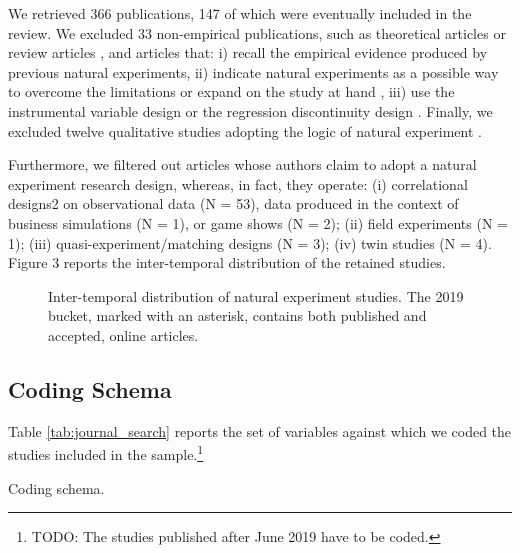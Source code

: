 \documentclass[nobib]{tufte-handout}
\newcommand{\todo}[1]{}
\renewcommand{\todo}[1]{{\color{red} TODO: {#1}}}
\begin{document}
\begin{refsection}
We retrieved 366 publications, 147 of which were eventually included in the
review.  We excluded 33 non-empirical publications, such as theoretical articles
\parencite[e.g.,][]{makadok2011} or review articles
\parencite[e.g.,][]{shaver2020}, and articles that: i) recall the empirical
evidence produced by previous natural experiments, ii) indicate natural
experiments as a possible way to overcome the limitations or expand on the study
at hand \parencite[e.g.,][]{hsu2006}, iii) use the instrumental variable design
\parencite[e.g.,][]{zoloty2018} or the regression discontinuity design
\parencite[e.g.,][]{flammer2015}. Finally, we excluded twelve qualitative studies
adopting the logic of natural experiment \parencite[e.g.,][]{powell2017}.

Furthermore, we filtered out articles whose authors claim to adopt a natural
experiment research design, whereas, in fact, they operate: (i) correlational
designs2 on observational data (N = 53), data produced in the context of
business simulations (N = 1), or game shows (N = 2); (ii) field experiments (N =
1); (iii) quasi-experiment/matching designs (N = 3); (iv) twin studies (N = 4).
Figure 3 reports the inter-temporal distribution of the retained studies.

\begin{figure}[]
    \centering
    
    \caption{Inter-temporal distribution of natural experiment studies.
    The 2019 bucket, marked with an asterisk, contains both published and 
    accepted, online articles.}
    \label{fig:studies_over_time}
\end{figure}

\subsection{Coding Schema}
\label{sub:coding_schema}

Table \ref{tab:journal_search} reports the set of variables against which we coded 
the studies included in the sample.\footnote{\todo{The studies published after June 2019 
have to be coded.}}

\begin{table}
    \large
    \sffamily
    \begin{small}
        \caption{}
        \label{tab:coding_schema}
        \begin{center}
            
        \end{center}
    \end{small}
    \caption{Coding schema.}
\end{table}


\end{refsection}
\end{document}
